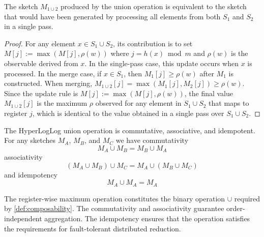 \begin{theorem}
    The sketch $M_{1 \cup 2}$ produced by the union operation is equivalent to the sketch that would have been generated by processing all elements from both $S_1$ and $S_2$ in a single pass.
\end{theorem}

\begin{proof}
    For any element $x \in S_1 \cup S_2$, its contribution is to set $M[j] := \max(M[j], \rho(w))$ where $j = h(x) \bmod m$ and $\rho(w)$ is the observable derived from $x$. In the single-pass case, this update occurs when $x$ is processed. In the merge case, if $x \in S_1$, then $M_1[j] \geq \rho(w)$ after $M_1$ is constructed. When merging, $M_{1 \cup 2}[j] = \max(M_1[j], M_2[j]) \geq \rho(w)$. Since the update rule is $M[j] := \max(M[j], \rho(w))$, the final value $M_{1 \cup 2}[j]$ is the maximum $\rho$ observed for any element in $S_1 \cup S_2$ that maps to register $j$, which is identical to the value obtained in a single pass over $S_1 \cup S_2$.
\end{proof}

\begin{theorem} \label{thm:hll-union-properties}
    The HyperLogLog union operation is commutative, associative, and idempotent. For any sketches $M_A$, $M_B$, and $M_C$ we have commutativity
    \begin{equation*}
        M_A \cup M_B = M_B \cup M_A
    \end{equation*}
    associativity
    \begin{equation*}
        (M_A \cup M_B) \cup M_C = M_A \cup (M_B \cup M_C)
    \end{equation*}
    and idempotency
    \begin{equation*}
        M_A \cup M_A = M_A
    \end{equation*}


\end{theorem}

The register-wise maximum operation constitutes the binary operation $\cup$ required by \ref{def:composability}. The commutativity and associativity guarantee order-independent aggregation. The idempotency ensures that the operation satisfies the requirements for fault-tolerant distributed reduction.

